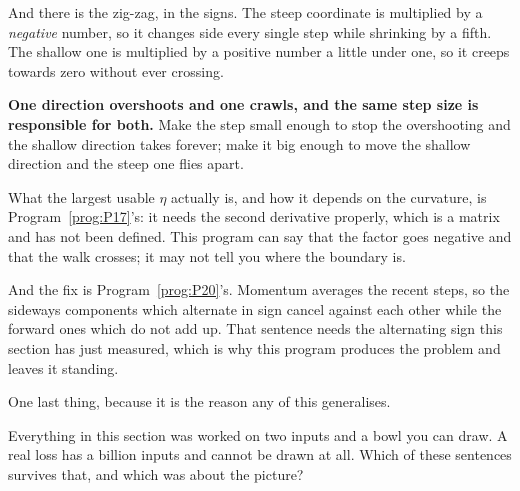 \begin{fr}
And there is the zig-zag, in the signs. The steep coordinate is multiplied by
a \emph{negative} number, so it changes side every single step while shrinking
by a fifth. The shallow one is multiplied by a positive number a little under
one, so it creeps towards zero without ever crossing.

\textbf{One direction overshoots and one crawls, and the same step size is
responsible for both.} Make the step small enough to stop the overshooting and
the shallow direction takes forever; make it big enough to move the shallow
direction and the steep one flies apart.

\begin{rigourbox}
What the largest usable $\eta$ actually is, and how it depends on the
curvature, is Program~\ref{prog:P17}'s: it needs the second derivative
properly, which is a matrix and has not been defined. This program can say
that the factor goes negative and that the walk crosses; it may not tell you
where the boundary is.

And the fix is Program~\ref{prog:P20}'s. Momentum averages the recent steps,
so the sideways components \dash{} which alternate in sign \dash{} cancel
against each other while the forward ones \dash{} which do not \dash{} add up.
That sentence needs the alternating sign this section has just measured,
which is why this program produces the problem and leaves it standing.
\end{rigourbox}
\end{fr}

\begin{fr}
One last thing, because it is the reason any of this generalises.

Everything in this section was worked on two inputs and a bowl you can draw. A
real loss has a billion inputs and cannot be drawn at all. Which of these
sentences survives that, and which was about the picture?
\dotline
\nextframe
\end{fr}

